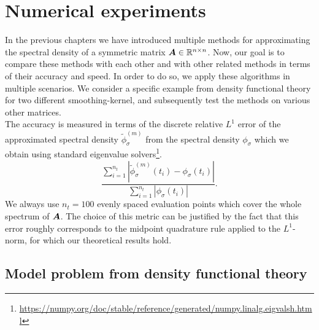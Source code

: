 \chapter{Numerical experiments}
\label{chp:5-experiments}

In the previous chapters we have introduced multiple methods for approximating the
spectral density of a symmetric matrix $\boldsymbol{A} \in \mathbb{R}^{n \times n}$. Now,
our goal is to compare these methods with each other and with other related methods
in terms of their accuracy and speed. In order to do so, we apply these algorithms
in multiple scenarios. We consider a specific example from density functional theory
\cite{lin2017randomized} for two different \gls{smoothing-kernel}, and
subsequently test the methods on various other matrices.\\

The accuracy is measured in terms of the discrete relative $L^1$ error of the approximated
spectral density $\widetilde{\phi}_{\sigma}^{(m)}$ from the spectral density $\phi_{\sigma}$
which we obtain using standard eigenvalue solvers\footnote{\url{https://numpy.org/doc/stable/reference/generated/numpy.linalg.eigvalsh.html}}.
\begin{equation}
    \frac{\sum_{i=1}^{n_t} |\widetilde{\phi}_{\sigma}^{(m)}(t_i) - \phi_{\sigma}(t_i)|}{\sum_{i=1}^{n_t} |\phi_{\sigma}(t_i)|}.
    \label{equ:5-experiments-L1-error}
\end{equation}
We always use $n_t=100$ evenly spaced evaluation points which cover the whole spectrum of
$\boldsymbol{A}$. The choice of this metric can be justified by the fact that this
error roughly corresponds to the midpoint quadrature rule \cite[chapter~9.2.1]{quarteroni2007numerical}
applied to the $L^1$-norm, for which our theoretical results hold.


\section{Model problem from density functional theory}
\label{sec:5-experiments-density-function}

